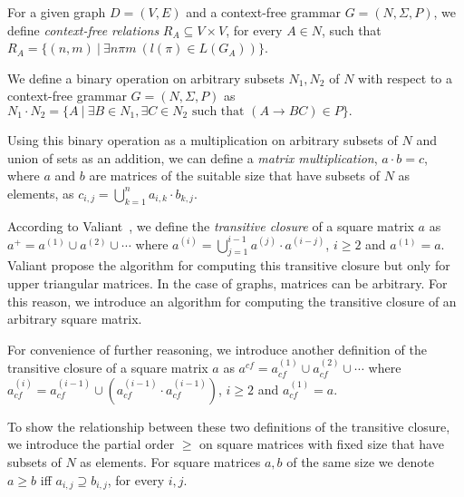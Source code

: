 For a given graph $D = (V, E)$ and a context-free grammar $G = (N, \Sigma, P)$, we define \textit{context-free relations} $R_A \subseteq V \times V$, for every $A \in N$, such that $R_A = \{(n,m)~|~\exists n \pi m~(l(\pi) \in L(G_A))\}$.

We define a binary operation on arbitrary subsets $N_1 , N_2$ of $N$ with respect to a context-free grammar $G = (N, \Sigma, P)$ as $N_1 \cdot N_2 = \{A~|~\exists B \in N_1, \exists C \in N_2 \text{ such that }(A \rightarrow B C) \in P\}.$

Using this binary operation as a multiplication on arbitrary subsets of $N$ and union of sets as an addition, we can define a \textit{matrix multiplication}, $a \cdot b = c$, where $a$ and $b$ are matrices of the suitable size that have subsets of $N$ as elements, as $c_{i,j} = \bigcup^{n}_{k=1}{a_{i,k} \cdot b_{k,j}}$.

According to Valiant~\cite{valiant}, we define the \textit{transitive closure} of a square matrix $a$ as $a^+ = a^{(1)} \cup a^{(2)} \cup \cdots$ where $a^{(i)} = \bigcup^{i-1}_{j=1}{a^{(j)} \cdot a^{(i-j)}}$, $i \ge 2$ and $a^{(1)} = a$. Valiant propose the algorithm for computing this transitive closure but only for upper triangular matrices. In the case of graphs, matrices can be arbitrary. For this reason, we introduce an algorithm for computing the transitive closure of an arbitrary square matrix.

For convenience of further reasoning, we introduce another definition of the transitive closure of a square matrix $a$ as $a^{cf} = a^{(1)}_{cf} \cup a^{(2)}_{cf} \cup \cdots$ where $a^{(i)}_{cf} = a^{(i-1)}_{cf} \cup (a^{(i-1)}_{cf} \cdot a^{(i-1)}_{cf})$, $i \ge 2$ and $a^{(1)}_{cf} = a$.

To show the relationship between these two definitions of the transitive closure, we introduce the partial order $\geq$ on square matrices with fixed size that have subsets of $N$ as elements. For square matrices $a, b$ of the same size we denote $a \geq b$ iff $a_{i,j} \supseteq b_{i,j}$, for every $i, j$.

